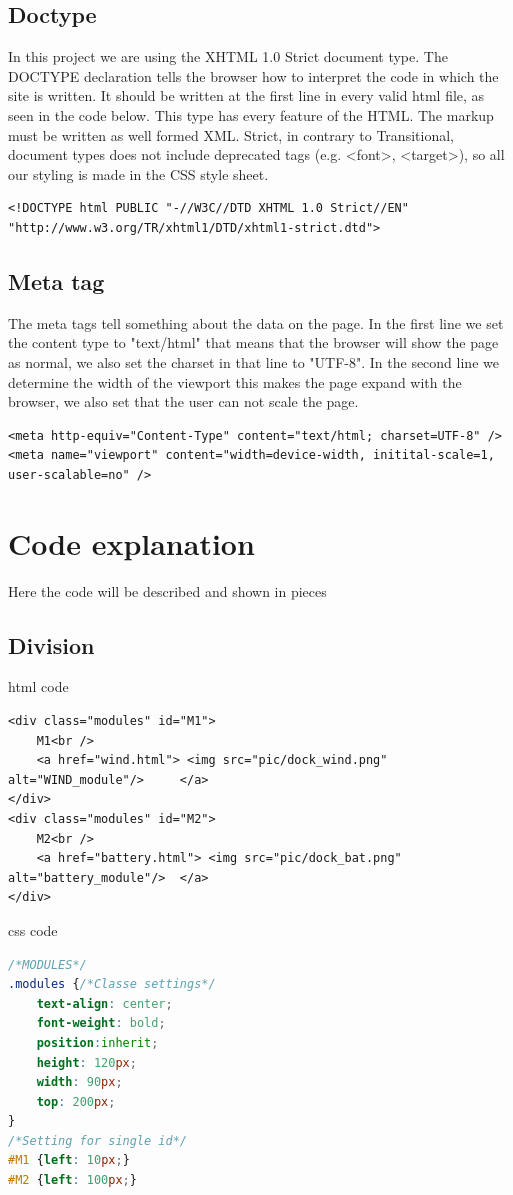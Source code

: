 \subsection{Doctype}
In this project we are using the XHTML 1.0 Strict document type. The DOCTYPE declaration tells the browser how to interpret the code in which the site is written. It should be written at the first line in every valid html file, as seen in the code below. This type has every feature of the HTML. The markup must be written as well formed XML. Strict, in contrary to Transitional, document types does not include deprecated tags (e.g. \textless font\textgreater , \textless target\textgreater), so all our styling is made in the CSS style sheet.
\begin{lstlisting}
<!DOCTYPE html PUBLIC "-//W3C//DTD XHTML 1.0 Strict//EN" "http://www.w3.org/TR/xhtml1/DTD/xhtml1-strict.dtd">
\end{lstlisting}

\subsection{Meta tag}
The meta tags tell something about the data on the page. In the first line we set the content type to "text/html" that means that the browser will show the page as normal, we also set the charset in that line to "UTF-8". In the second line we determine the width of the viewport this makes the page expand with the browser, we also set that the user can not scale the page.
\begin{lstlisting}
<meta http-equiv="Content-Type" content="text/html; charset=UTF-8" />
<meta name="viewport" content="width=device-width, initital-scale=1, user-scalable=no" />
\end{lstlisting}

\section{Code explanation}
Here the code will be described and shown in pieces
\subsection{Division}
html code
\begin{lstlisting}
<div class="modules" id="M1">		
	M1<br />
	<a href="wind.html"> <img src="pic/dock_wind.png"		alt="WIND_module"/> 	</a>
</div>
<div class="modules" id="M2">
	M2<br />
	<a href="battery.html"> <img src="pic/dock_bat.png" 	alt="battery_module"/>	</a>
</div>
\end{lstlisting}
css code
\begin{lstlisting}[language=CSS]
/*MODULES*/
.modules {/*Classe settings*/
	text-align: center;
	font-weight: bold;
	position:inherit;
	height: 120px;
	width: 90px;
	top: 200px;
}
/*Setting for single id*/
#M1	{left: 10px;}
#M2	{left: 100px;}
\end{lstlisting}

